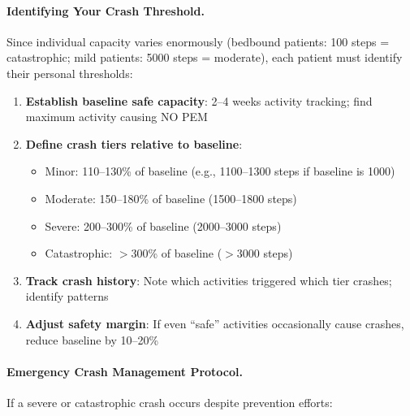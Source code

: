\paragraph{Identifying Your Crash Threshold.}

Since individual capacity varies enormously (bedbound patients: 100 steps = catastrophic; mild patients: 5000 steps = moderate), each patient must identify their personal thresholds:

\begin{enumerate}
    \item \textbf{Establish baseline safe capacity}: 2--4 weeks activity tracking; find maximum activity causing NO PEM
    \item \textbf{Define crash tiers relative to baseline}:
    \begin{itemize}
        \item Minor: 110--130\% of baseline (e.g., 1100--1300 steps if baseline is 1000)
        \item Moderate: 150--180\% of baseline (1500--1800 steps)
        \item Severe: 200--300\% of baseline (2000--3000 steps)
        \item Catastrophic: $>$300\% of baseline ($>$3000 steps)
    \end{itemize}
    \item \textbf{Track crash history}: Note which activities triggered which tier crashes; identify patterns
    \item \textbf{Adjust safety margin}: If even ``safe'' activities occasionally cause crashes, reduce baseline by 10--20\%
\end{enumerate}

\paragraph{Emergency Crash Management Protocol.}

If a severe or catastrophic crash occurs despite prevention efforts:

